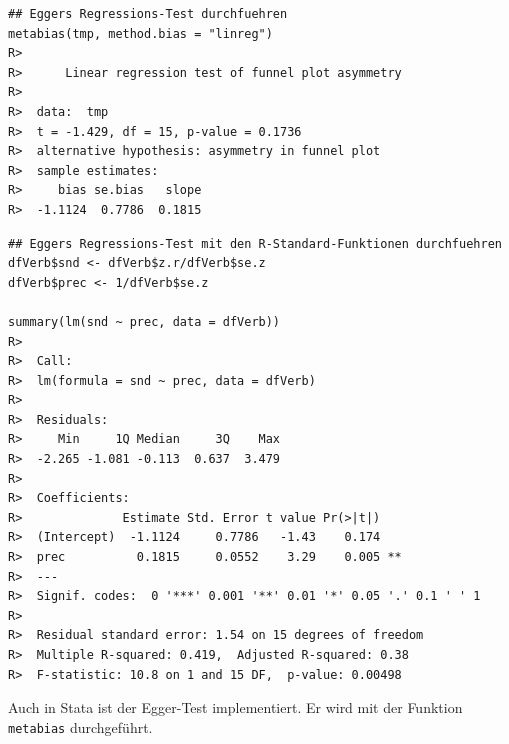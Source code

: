 \documentclass[normalheadings, 10pt]{scrartcl}\usepackage{graphicx, color}
\makeatletter
\newenvironment{kframe}{%
 \def\at@end@of@kframe{}%
 \ifinner\ifhmode%
  \def\at@end@of@kframe{\end{minipage}}%
  \begin{minipage}{\columnwidth}%
 \fi\fi%
 \def\FrameCommand##1{\hskip\@totalleftmargin \hskip-\fboxsep
 \colorbox{shadecolor}{##1}\hskip-\fboxsep
     \hskip-\linewidth \hskip-\@totalleftmargin \hskip\columnwidth}%
 \MakeFramed {\advance\hsize-\width
   \@totalleftmargin\z@ \linewidth\hsize
   \@setminipage}}%
 {\par\unskip\endMakeFramed%
 \at@end@of@kframe}
\newenvironment{knitrout}{}{} %
\newcommand{\code}[1]{\texttt{#1}}
\makeatother
\begin{document}
\begin{rbsp}
\begin{knitrout}
\color{fgcolor}\begin{kframe}
\begin{verbatim}
## Eggers Regressions-Test durchfuehren
metabias(tmp, method.bias = "linreg")
R>  
R>  	Linear regression test of funnel plot asymmetry
R>  
R>  data:  tmp 
R>  t = -1.429, df = 15, p-value = 0.1736
R>  alternative hypothesis: asymmetry in funnel plot 
R>  sample estimates:
R>     bias se.bias   slope 
R>  -1.1124  0.7786  0.1815
\end{verbatim}
\end{kframe}
\end{knitrout}

\end{rbsp}

\begin{rbsp}
\begin{knitrout}
\color{fgcolor}\begin{kframe}
\begin{verbatim}
## Eggers Regressions-Test mit den R-Standard-Funktionen durchfuehren
dfVerb$snd <- dfVerb$z.r/dfVerb$se.z
dfVerb$prec <- 1/dfVerb$se.z

summary(lm(snd ~ prec, data = dfVerb))
R>  
R>  Call:
R>  lm(formula = snd ~ prec, data = dfVerb)
R>  
R>  Residuals:
R>     Min     1Q Median     3Q    Max 
R>  -2.265 -1.081 -0.113  0.637  3.479 
R>  
R>  Coefficients:
R>              Estimate Std. Error t value Pr(>|t|)   
R>  (Intercept)  -1.1124     0.7786   -1.43    0.174   
R>  prec          0.1815     0.0552    3.29    0.005 **
R>  ---
R>  Signif. codes:  0 '***' 0.001 '**' 0.01 '*' 0.05 '.' 0.1 ' ' 1 
R>  
R>  Residual standard error: 1.54 on 15 degrees of freedom
R>  Multiple R-squared: 0.419,	Adjusted R-squared: 0.38 
R>  F-statistic: 10.8 on 1 and 15 DF,  p-value: 0.00498
\end{verbatim}
\end{kframe}
\end{knitrout}

\end{rbsp}

Auch in Stata ist der Egger-Test implementiert. Er wird mit der Funktion \code{metabias} durchgeführt.

\begin{statabsp}
  \begin{tiny}
    
  \end{tiny}

\end{statabsp}
\end{document}
